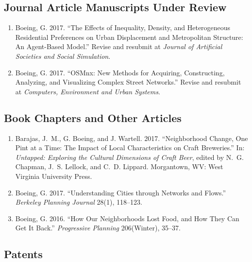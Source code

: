 \documentclass[11pt,letterpaper]{report}
\begin{document}
\subsection*{Journal Article Manuscripts Under Review}

\begin{enumerate}[resume]

\item Boeing, G. 2017. \enquote{The Effects of Inequality, Density, and Heterogeneous Residential Preferences on Urban Displacement and Metropolitan Structure: An Agent-Based Model.} Revise and resubmit at \emph{Journal of Artificial Societies and Social Simulation}.

\item Boeing, G. 2017. \enquote{OSMnx: New Methods for Acquiring, Constructing, Analyzing, and Visualizing Complex Street Networks.} Revise and resubmit at \emph{Computers, Environment and Urban Systems}.

\end{enumerate}



\subsection*{Book Chapters and Other Articles}

\begin{enumerate}[resume]

\item Barajas, J.~M., G. Boeing, and J. Wartell. 2017. \enquote{Neighborhood Change, One Pint at a Time: The Impact of Local Characteristics on Craft Breweries.} In: \emph{Untapped: Exploring the Cultural Dimensions of Craft Beer}, edited by N.~G. Chapman, J.~S. Lellock, and C.~D. Lippard. Morgantown, WV: West Virginia University Press.

\item Boeing, G. 2017. \enquote{Understanding Cities through Networks and Flows.} \emph{Berkeley Planning Journal} 28(1), 118--123.

\item Boeing, G. 2016. \enquote{How Our Neighborhoods Lost Food, and How They Can Get It Back.} \emph{Progressive Planning} 206(Winter), 35--37.

\end{enumerate}



\subsection*{Patents}
\end{document}

